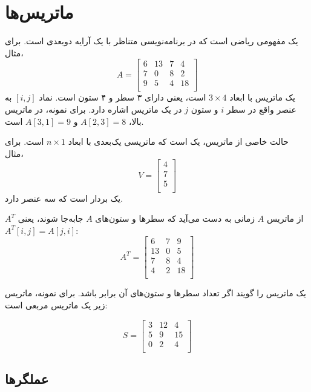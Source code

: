 \chapter{ماتریس‌ها}


یک  مفهومی ریاضی است
که در برنامه‌نویسی متناظر با یک آرایه دوبعدی است. برای مثال،
\[
A = 
 \begin{bmatrix}
  6 & 13 & 7 & 4 \\
  7 & 0 & 8 & 2 \\
  9 & 5 & 4 & 18 \\
 \end{bmatrix}
\]
یک ماتریس با ابعاد $3 \times 4$ است، یعنی
دارای ۳ سطر و ۴ ستون است.
نماد $[i,j]$ به عنصر واقع در سطر $i$ و ستون $j$
در یک ماتریس اشاره دارد.
برای نمونه، در ماتریس بالا،
$A[2,3]=8$ و $A[3,1]=9$ است.


حالت خاصی از ماتریس، یک  است
که ماتریسی یک‌بعدی با ابعاد $n \times 1$ است.
برای مثال،
\[
V =
\begin{bmatrix}
4 \\
7 \\
5 \\
\end{bmatrix}
\]
یک بردار است که سه عنصر دارد.


 $A^T$ از ماتریس $A$
زمانی به دست می‌آید که سطرها و ستون‌های $A$
جابه‌جا شوند، یعنی $A^T[i,j]=A[j,i]$:
\[
A^T = 
 \begin{bmatrix}
  6 & 7 & 9 \\
  13 & 0 & 5 \\
  7 & 8 & 4 \\
  4 & 2 & 18 \\
 \end{bmatrix}
\]


یک ماتریس را  گویند اگر
تعداد سطرها و ستون‌های آن برابر باشد.
برای نمونه، ماتریس زیر یک
ماتریس مربعی است:

\[
S = 
 \begin{bmatrix}
  3 & 12 & 4  \\
  5 & 9 & 15  \\
  0 & 2 & 4 \\
 \end{bmatrix}
\]

\section{عملگرها}


